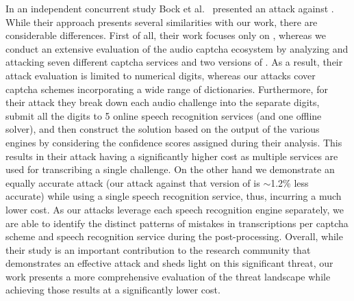 In an independent concurrent study Bock et al.~\cite{bock17uncaptcha} presented an attack against \re.
While their approach presents several similarities with our work, there are considerable differences. First of all,
their work focuses only on \re, whereas we conduct an extensive evaluation of the audio captcha ecosystem by analyzing
and attacking seven different captcha services and two versions of \re. As a result, their attack evaluation is limited to
numerical digits, whereas our attacks cover captcha schemes incorporating a wide range of dictionaries.
Furthermore, for their attack they break down each audio challenge into the separate digits,
submit all the digits to 5 online speech recognition services (and one offline solver), and then construct the solution based 
on the output of the various engines by considering the confidence scores assigned during their analysis.
This results in their attack having a significantly higher cost as multiple services are used for 
transcribing a single challenge. On the other hand we demonstrate an equally accurate attack (our attack against 
that version of \re is $\sim$1.2\% less accurate) while using a single speech recognition service, thus, incurring a much lower cost.
As our attacks leverage each speech recognition engine separately, we are able to identify the distinct patterns 
of mistakes in transcriptions per captcha scheme and speech recognition service during the post-processing.
Overall, while their study is an important contribution to the research community that demonstrates an effective attack and 
sheds light on this significant threat, our work presents a more comprehensive evaluation of the threat landscape while achieving
those results at a significantly lower cost.

